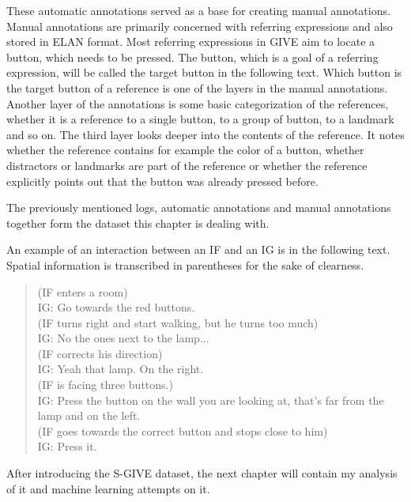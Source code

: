 These automatic annotations served as a base for creating manual annotations. Manual annotations are primarily concerned with referring expressions and also stored in ELAN format. Most referring expressions in GIVE aim to locate a button, which needs to be pressed. The button, which is a goal of a referring expression, will be called the target button in the following text. Which button is the target button of a reference is one of the layers in the manual annotations. Another layer of the annotations is some basic categorization of the references, whether it is a reference to a single button, to a group of button, to a landmark and so on. The third layer looks deeper into the contents of the reference. It notes whether the reference contains for example the color of a button, whether distractors or landmarks are part of the reference or whether the reference explicitly points out that the button was already pressed before.

The previously mentioned logs, automatic annotations and manual annotations together form the dataset this chapter is dealing with.

An example of an interaction between an IF and an IG is in the following text. Spatial information is transcribed in parentheses for the sake of clearness.

\begin{verse}
(IF enters a room)\\
IG: Go towards the red buttons.\\
(IF turns right and start walking, but he turns too much)\\
IG: No the ones next to the lamp...\\
(IF corrects his direction)\\
IG: Yeah that lamp. On the right.\\
(IF is facing three buttons.)\\
IG: Press the button on the wall you are looking at, that's far from the lamp and on the left. \\
(IF goes towards the correct button and stops close to him)\\
IG: Press it.\\
\end{verse}

After introducing the S-GIVE dataset, the next chapter will contain my analysis of it and machine learning attempts on it.




